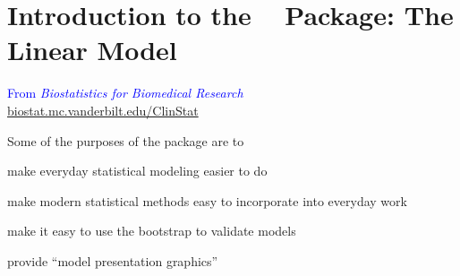 

\def\apacue{1}
\chapter{Introduction to the \R\  Package:
  The Linear Model}\label{chap:rmsintro}
\begin{flushright}\small
\textcolor{blue}{From \emph{Biostatistics for Biomedical
      Research} \\\url{biostat.mc.vanderbilt.edu/ClinStat}}
\end{flushright}
Some of the purposes of the  package are to
\bi
\item make everyday statistical modeling easier to do
\item make modern statistical methods easy to incorporate into everyday work
\item make it easy to use the bootstrap to validate models
\item provide ``model presentation graphics''
\ei
  
